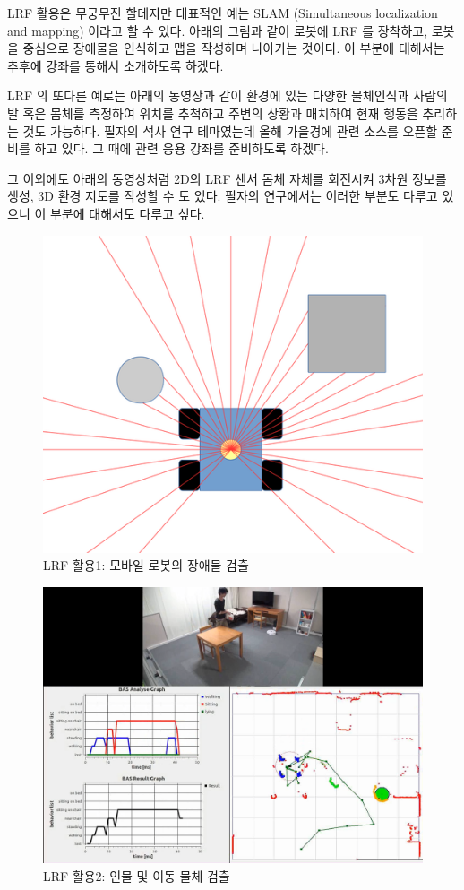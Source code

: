 LRF 활용은 무궁무진 할테지만 대표적인 예는 SLAM (Simultaneous localization and mapping) 이라고 할 수 있다. 아래의 그림과 같이 로봇에 LRF 를 장착하고, 로봇을 중심으로 장애물을 인식하고 맵을 작성하며 나아가는 것이다. 이 부분에 대해서는 추후에 강좌를 통해서 소개하도록 하겠다.

LRF 의 또다른 예로는 아래의 동영상과 같이 환경에 있는 다양한 물체인식과 사람의 발 혹은 몸체를 측정하여 위치를 추척하고 주변의 상황과 매치하여 현재 행동을 추리하는 것도 가능하다. 필자의 석사 연구 테마였는데 올해 가을경에 관련 소스를 오픈할 준비를 하고 있다. 그 때에 관련 응용 강좌를 준비하도록 하겠다.

그 이외에도 아래의 동영상처럼 2D의 LRF 센서 몸체 자체를 회전시켜 3차원 정보를 생성, 3D 환경 지도를 작성할 수 도 있다. 필자의 연구\cite{pyo2014floor}에서는 이러한 부분도 다루고 있으니 이 부분에 대해서도 다루고 싶다.

\begin{figure}[h]
\centering\includegraphics[width=0.5\columnwidth]{pictures/chapter9/lrfandrobot.png}
\caption{LRF 활용1: 모바일 로봇의 장애물 검출}
\end{figure}

\begin{figure}[h]
\centering\includegraphics[width=0.7\columnwidth]{pictures/chapter9/fss.png}
\caption{LRF 활용2: 인물 및 이동 물체 검출}
\end{figure}

